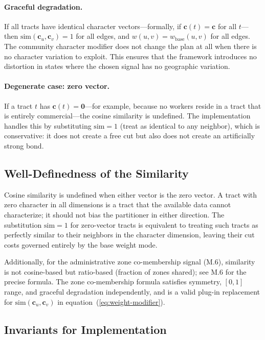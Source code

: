 \paragraph{Graceful degradation.}
If all tracts have identical character vectors---formally, if
$\mathbf{c}(t) = \mathbf{c}$ for all $t$---then
$\mathrm{sim}(\mathbf{c}_u, \mathbf{c}_v) = 1$ for all edges, and
$w(u,v) = w_{\mathrm{base}}(u,v)$ for all edges.
The community character modifier does not change the plan at all when there is no
character variation to exploit.
This ensures that the framework introduces no distortion in states where the chosen
signal has no geographic variation.

\paragraph{Degenerate case: zero vector.}
If a tract $t$ has $\mathbf{c}(t) = \mathbf{0}$---for example, because no workers
reside in a tract that is entirely commercial---the cosine similarity is undefined.
The implementation handles this by substituting $\mathrm{sim} = 1$ (treat as identical
to any neighbor), which is conservative: it does not create a free cut but also does
not create an artificially strong bond.

\subsection{Well-Definedness of the Similarity}

Cosine similarity is undefined when either vector is the zero vector.
A tract with zero character in all dimensions is a tract that the available data
cannot characterize; it should not bias the partitioner in either direction.
The substitution $\mathrm{sim} = 1$ for zero-vector tracts is equivalent to treating
such tracts as perfectly similar to their neighbors in the character dimension,
leaving their cut costs governed entirely by the base weight mode.

Additionally, for the administrative zone co-membership signal (M.6), similarity is
not cosine-based but ratio-based (fraction of zones shared); see M.6 for the precise
formula.
The zone co-membership formula satisfies symmetry, $[0,1]$ range, and graceful
degradation independently, and is a valid plug-in replacement for
$\mathrm{sim}(\mathbf{c}_u, \mathbf{c}_v)$ in equation~(\ref{eq:weight-modifier}).

\subsection{Invariants for Implementation}


